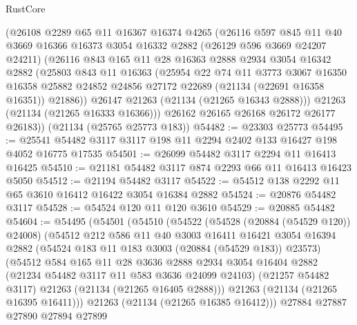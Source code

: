 \begin{lexlean}{RustCore}
\begin{coremodule}
      (@26108
        @2289
        @65
        @11
        @16367
        @16374
        @4265
        (@26116
          @597
          @845
          @11
          @40
          @3669
          @16366
          @16373
          @3054
          @16332
          @2882
          (@26129 @596 @3669 @24207 @24211)
          (@26116
            @843
            @165
            @11
            @28
            @16363
            @2888
            @2934
            @3054
            @16342
            @2882
            (@25803
              @843
              @11
              @16363
              (@25954
                @22
                @74
                @11
                @3773
                @3067
                @16350
                @16358
                @25882
                @24852
                @24856
                @27172
                @22689
                (@21134 (@22691 @16358 @16351))
                @21886))
            @26147
            @21263
            (@21134 (@21265 @16343 @2888)))
          @21263
          (@21134 (@21265 @16333 @16366)))
        @26162
        @26165
        @26168
        @26172
        @26177
        @26183))
    (@21134 (@25765 @25773 @183))
@54482 := @23303 @25773
@54495 := @25541 @54482 @3117 @3117 @198 @11 @2294 @2402 @133 @16427 @198 @4052 @16775 @17535
@54501 := @26099 @54482 @3117 @2294 @11 @16413 @16425
@54510 := @21181 @54482 @3117 @874 @2293 @66 @11 @16413 @16423 @5050
@54512 := @21194 @54482 @3117
@54522 := @54512 @138 @2292 @11 @65 @3610 @16412 @16422 @3054 @16384 @2882
@54524 := @20876 @54482 @3117
@54528 := @54524 @120 @11 @120 @3610
@54529 := @20885 @54482
@54604 := @54495
    (@54501
      (@54510
        (@54522
          (@54528 (@20884 (@54529 @120)) @24008)
          (@54512
            @212
            @586
            @11
            @40
            @3003
            @16411
            @16421
            @3054
            @16394
            @2882
            (@54524 @183 @11 @183 @3003 (@20884 (@54529 @183)) @23573)
            (@54512
              @584
              @165
              @11
              @28
              @3636
              @2888
              @2934
              @3054
              @16404
              @2882
              (@21234 @54482 @3117 @11 @583 @3636 @24099 @24103)
              (@21257 @54482 @3117)
              @21263
              (@21134 (@21265 @16405 @2888)))
            @21263
            (@21134 (@21265 @16395 @16411)))
          @21263
          (@21134 (@21265 @16385 @16412)))
        @27884
        @27887
        @27890
        @27894
        @27899

\end{coremodule}
\end{lexlean}
